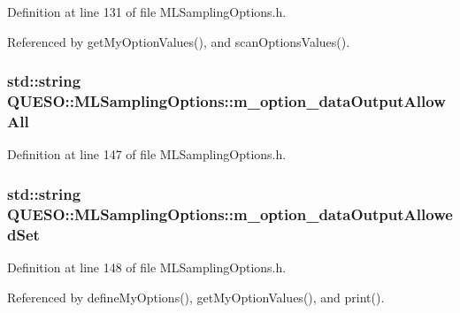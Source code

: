 Definition at line 131 of file M\-L\-Sampling\-Options.\-h.



Referenced by get\-My\-Option\-Values(), and scan\-Options\-Values().

\hypertarget{class_q_u_e_s_o_1_1_m_l_sampling_options_af2f225d4068ab602b17ae28242596ddd}{
\subsubsection[{m\-\_\-option\-\_\-data\-Output\-Allow\-All}]{\setlength{\rightskip}{0pt plus 5cm}std\-::string Q\-U\-E\-S\-O\-::\-M\-L\-Sampling\-Options\-::m\-\_\-option\-\_\-data\-Output\-Allow\-All\hspace{0.3cm}{\ttfamily [private]}}}\label{class_q_u_e_s_o_1_1_m_l_sampling_options_af2f225d4068ab602b17ae28242596ddd}


Definition at line 147 of file M\-L\-Sampling\-Options.\-h.

\hypertarget{class_q_u_e_s_o_1_1_m_l_sampling_options_a0dc0efc965101db9b18888c3db5bef99}{
\subsubsection[{m\-\_\-option\-\_\-data\-Output\-Allowed\-Set}]{\setlength{\rightskip}{0pt plus 5cm}std\-::string Q\-U\-E\-S\-O\-::\-M\-L\-Sampling\-Options\-::m\-\_\-option\-\_\-data\-Output\-Allowed\-Set\hspace{0.3cm}{\ttfamily [private]}}}\label{class_q_u_e_s_o_1_1_m_l_sampling_options_a0dc0efc965101db9b18888c3db5bef99}


Definition at line 148 of file M\-L\-Sampling\-Options.\-h.



Referenced by define\-My\-Options(), get\-My\-Option\-Values(), and print().

